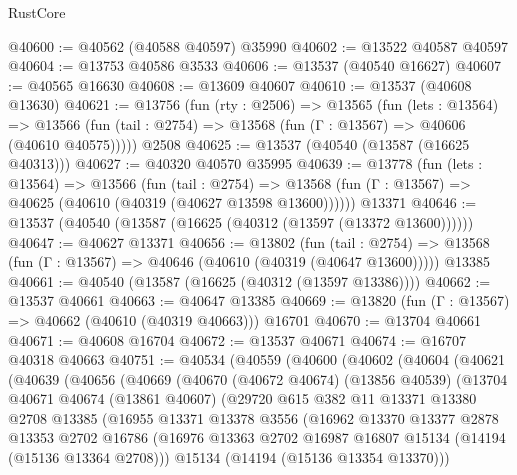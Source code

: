 \begin{lexlean}{RustCore}
\begin{coremodule}
@40600 := @40562 (@40588 @40597) @35990
@40602 := @13522 @40587 @40597
@40604 := @13753 @40586 @3533
@40606 := @13537 (@40540 @16627)
@40607 := @40565 @16630
@40608 := @13609 @40607
@40610 := @13537 (@40608 @13630)
@40621 := @13756
    (fun (rty : @2506) =>
    @13565
      (fun (lets : @13564) =>
      @13566 (fun (tail : @2754) => @13568 (fun (Γ : @13567) => @40606 (@40610 @40575)))))
    @2508
@40625 := @13537 (@40540 (@13587 (@16625 @40313)))
@40627 := @40320 @40570 @35995
@40639 := @13778
    (fun (lets : @13564) =>
    @13566
      (fun (tail : @2754) =>
      @13568 (fun (Γ : @13567) => @40625 (@40610 (@40319 (@40627 @13598 @13600))))))
    @13371
@40646 := @13537 (@40540 (@13587 (@16625 (@40312 (@13597 (@13372 @13600))))))
@40647 := @40627 @13371
@40656 := @13802
    (fun (tail : @2754) => @13568 (fun (Γ : @13567) => @40646 (@40610 (@40319 (@40647 @13600)))))
    @13385
@40661 := @40540 (@13587 (@16625 (@40312 (@13597 @13386))))
@40662 := @13537 @40661
@40663 := @40647 @13385
@40669 := @13820 (fun (Γ : @13567) => @40662 (@40610 (@40319 @40663))) @16701
@40670 := @13704 @40661
@40671 := @40608 @16704
@40672 := @13537 @40671
@40674 := @16707 @40318 @40663
@40751 := @40534
    (@40559
      (@40600
        (@40602
          (@40604
            (@40621
              (@40639
                (@40656
                  (@40669
                    (@40670
                      (@40672 @40674)
                      (@13856 @40539)
                      (@13704
                        @40671
                        @40674
                        (@13861 @40607)
                        (@29720
                          @615
                          @382
                          @11
                          @13371
                          @13380
                          @2708
                          @13385
                          (@16955
                            @13371
                            @13378
                            @3556
                            (@16962
                              @13370
                              @13377
                              @2878
                              @13353
                              @2702
                              @16786
                              (@16976
                                @13363
                                @2702
                                @16987
                                @16807
                                @15134
                                (@14194 (@15136 @13364 @2708)))
                              @15134
                              (@14194 (@15136 @13354 @13370)))

\end{coremodule}
\end{lexlean}
